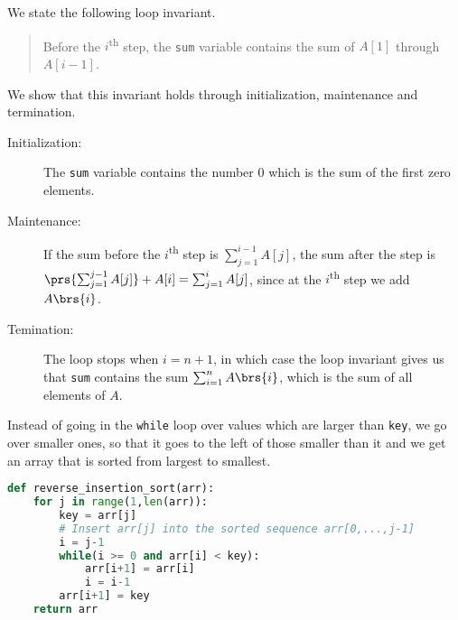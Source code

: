 \documentclass[oneside]{scrbook}
\newcommand{\codeword}[1]{\texttt{#1}}
\theoremstyle{definition}
\begin{document}
\begin{exercise}
    We state the following loop invariant.
    \begin{quote}
        Before the $i$\textsuperscript{th} step, the \codeword{sum} variable contains the sum of $A[1]$ through $A[i-1]$.
    \end{quote}

    We show that this invariant holds through initialization, maintenance and termination.

    \begin{description}
    \item[Initialization:]
    The \codeword{sum} variable contains the number $0$ which is the sum of the first zero elements.

    \item[Maintenance:]
    If the sum before the $i$\textsuperscript{th} step is $\sum_{j=1}^{i-1} A[j]$, the sum after the step is $\prs{\sum_{j=1}^{j-1} A[j]} + A[i] = \sum_{j=1}^i A[j]$, since at the $i$\textsuperscript{th} step we add $A\brs{i}$. 

    \item[Temination:]
    The loop stops when $i = n+1$, in which case the loop invariant gives us that \codeword{sum} contains the sum $\sum_{i=1}^n A\brs{i}$, which is the sum of all elements of $A$.
    
    \end{description}
\end{exercise}

\begin{exercise}
    Instead of going in the \codeword{while} loop over values which are larger than \codeword{key}, we go over smaller ones, so that it goes to the left of those smaller than it and we get an array that is sorted from largest to smallest. 

\begin{lstlisting}[language=Python]
def reverse_insertion_sort(arr):
	for j in range(1,len(arr)):
		key = arr[j]
		# Insert arr[j] into the sorted sequence arr[0,...,j-1]
		i = j-1
		while(i >= 0 and arr[i] < key):
			arr[i+1] = arr[i]
			i = i-1
		arr[i+1] = key
	return arr
\end{lstlisting}
\end{exercise}
\end{document}
